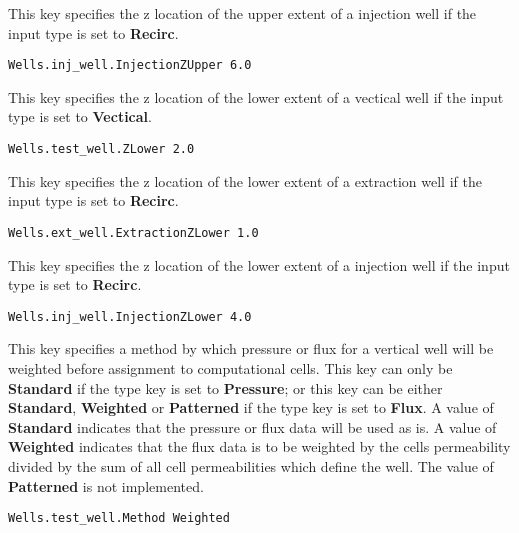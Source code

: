 {
This key specifies the z location of the upper extent of a injection
well if the input type is set to {\bf Recirc}.
}
\begin{display}\begin{verbatim}
Wells.inj_well.InjectionZUpper 6.0
\end{verbatim}\end{display}

{
This key specifies the z location of the lower extent of a vectical well
if the input type is set to {\bf Vectical}.
}
\begin{display}\begin{verbatim}
Wells.test_well.ZLower 2.0
\end{verbatim}\end{display}

{
This key specifies the z location of the lower extent of a extraction
well if the input type is set to {\bf Recirc}.
}
\begin{display}\begin{verbatim}
Wells.ext_well.ExtractionZLower 1.0
\end{verbatim}\end{display}

{
This key specifies the z location of the lower extent of a injection
well if the input type is set to {\bf Recirc}.
}
\begin{display}\begin{verbatim}
Wells.inj_well.InjectionZLower 4.0
\end{verbatim}\end{display}

{
This key specifies a method by which pressure or flux for a vertical
well will be weighted before assignment to computational cells.  This
key can only be {\bf Standard} if the type key is set to {\bf Pressure};
or this key can be either {\bf Standard}, {\bf Weighted} or
{\bf Patterned} if the type key is set to {\bf Flux}.  A value of
{\bf Standard} indicates that the pressure or flux data will be used as
is.  A value of {\bf Weighted} indicates that the flux data is to be
weighted by the cells permeability divided by the sum of all cell
permeabilities which define the well.  The value of {\bf Patterned} is
not implemented.
}
\begin{display}\begin{verbatim}
Wells.test_well.Method Weighted
\end{verbatim}\end{display}

